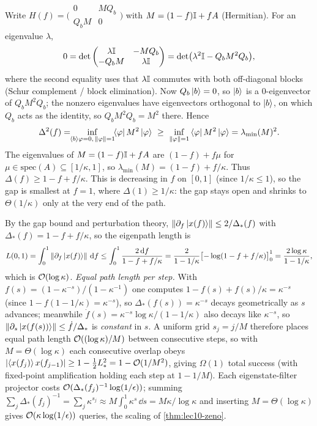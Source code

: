 \begin{solution}
Write $H(f)=\bigl(\begin{smallmatrix}0&MQ_b\\ Q_bM&0\end{smallmatrix}\bigr)$ with
$M=(1-f)\mathbb{I}+fA$ (Hermitian). For an eigenvalue $\lambda$,
\[
  0=\det\begin{pmatrix}\lambda\mathbb{I}&-MQ_b\\ -Q_bM&\lambda\mathbb{I}\end{pmatrix}
  =\det\bigl(\lambda^2\mathbb{I}-Q_bM^2Q_b\bigr),
\]
where the second equality uses that $\lambda\mathbb{I}$ commutes with both off-diagonal blocks
(Schur complement / block elimination). Now $Q_b\ket b=0$, so $\ket b$ is a
$0$-eigenvector of $Q_bM^2Q_b$; the nonzero eigenvalues have eigenvectors orthogonal to
$\ket b$, on which $Q_b$ acts as the identity, so $Q_bM^2Q_b=M^2$ there. Hence
\[
  \Delta^2(f)=\!\!\inf_{\braket{b}{\varphi}=0,\,\left\lVert \varphi \right\rVert=1}\!\!\bra\varphi M^2\ket\varphi
  \ \ge\ \inf_{\left\lVert \varphi \right\rVert=1}\bra\varphi M^2\ket\varphi
  =\lambda_{\min}(M)^2.
\]
The eigenvalues of $M=(1-f)\mathbb{I}+fA$ are $(1-f)+f\mu$ for $\mu\in\mathrm{spec}(A)\subseteq
[1/\kappa,1]$, so $\lambda_{\min}(M)=(1-f)+f/\kappa$. Thus $\Delta(f)\ge1-f+f/\kappa$.
This is decreasing in $f$ on $[0,1]$ (since $1/\kappa\le1$), so the gap is smallest at
$f=1$, where $\Delta(1)\ge1/\kappa$: the gap stays open and shrinks to $\Theta(1/\kappa)$
only at the very end of the path.
\end{solution}

\begin{solution}
By the gap bound and perturbation theory, $\left\lVert \partial_f\ket{x(f)} \right\rVert\le2/\Delta_*(f)$
with $\Delta_*(f)=1-f+f/\kappa$, so the eigenpath length is
\[
  L(0,1)=\int_0^1\left\lVert \partial_f\ket{x(f)} \right\rVert\,\mathrm{d} f
  \le\int_0^1\frac{2\,\mathrm{d} f}{1-f+f/\kappa}
  =\frac{2}{1-1/\kappa}\bigl[-\log(1-f+f/\kappa)\bigr]_0^1
  =\frac{2\log\kappa}{1-1/\kappa},
\]
which is $\mathcal{O}(\log\kappa)$. \emph{Equal path length per step.} With
$f(s)=(1-\kappa^{-s})/(1-\kappa^{-1})$ one computes $1-f(s)+f(s)/\kappa=\kappa^{-s}$
(since $1-f(1-1/\kappa)=\kappa^{-s}$), so $\Delta_*(f(s))=\kappa^{-s}$ decays
geometrically as $s$ advances; meanwhile $\dot f(s)=\kappa^{-s}\log\kappa/(1-1/\kappa)$
also decays like $\kappa^{-s}$, so $\left\lVert \partial_s\ket{x(f(s))} \right\rVert\le\dot f/\Delta_*$ is
\emph{constant} in $s$. A uniform grid $s_j=j/M$ therefore places equal path length
$\mathcal{O}((\log\kappa)/M)$ between consecutive steps, so with $M=\Theta(\log\kappa)$ each
consecutive overlap obeys $\left\lvert \braket{x(f_j)}{x(f_{j-1})} \right\rvert\ge1-\tfrac12 L_*^2
=1-\mathcal{O}(1/M^2)$, giving $\Omega(1)$ total success (with fixed-point amplification
holding each step at $1-1/M$). Each eigenstate-filter projector costs
$\mathcal{O}(\Delta_*(f_j)^{-1}\log(1/\epsilon))$; summing $\sum_j\Delta_*(f_j)^{-1}=\sum_j
\kappa^{s_j}\approx M\int_0^1\kappa^s\,\dd s=M\kappa/\log\kappa$ and inserting
$M=\Theta(\log\kappa)$ gives $\mathcal{O}(\kappa\log(1/\epsilon))$ queries, the scaling of
\cref{thm:lec10-zeno}.
\end{solution}

